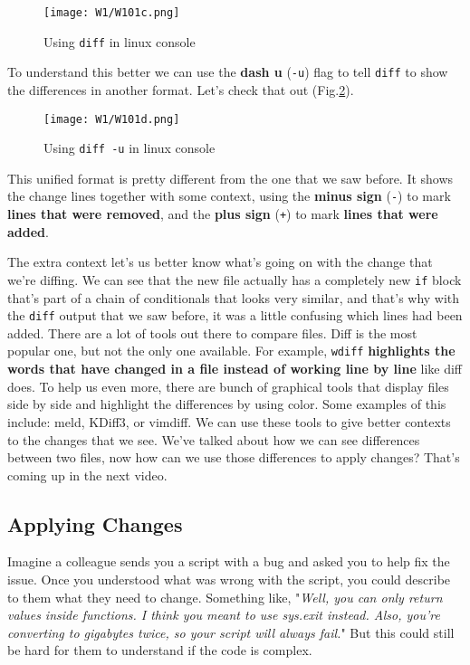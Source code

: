 	\begin{figure} 
		\caption{Using \texttt{diff} in linux console}
		\centering
		\texttt{[image: W1/W101c.png]}
		\label{W101c-diff}
	\end{figure}
	
	
	To understand this better we can use the \textbf{dash u} (\texttt{-u}) flag to tell \texttt{diff} to show the differences in another format. Let's check that out (Fig.\ref{W101d-diff-u}).
	
	\begin{figure} 
		\caption{Using \texttt{diff -u} in linux console}
		\centering
		\texttt{[image: W1/W101d.png]}
		\label{W101d-diff-u}
	\end{figure}

	This unified format is pretty different from the one that we saw before. It shows the change lines together with some context, using the \textbf{minus sign} (\texttt{-}) to mark \textbf{lines that were removed}, and the \textbf{plus sign} (\texttt{+}) to mark \textbf{lines that were added}. 
	
	The extra context let's us better know what's going on with the change that we're diffing. We can see that the new file actually has a completely new \texttt{if} block that's part of a chain of conditionals that looks very similar, and that's why with the \texttt{diff} output that we saw before, it was a little confusing which lines had been added. There are a lot of tools out there to compare files. Diff is the most popular one, but not the only one available. For example, \texttt{wdiff} \textbf{highlights the words that have changed in a file instead of working line by line} like diff does. To help us even more, there are bunch of graphical tools that display files side by side and highlight the differences by using color. Some examples of this include: meld, KDiff3, or vimdiff. We can use these tools to give better contexts to the changes that we see. We've talked about how we can see differences between two files, now how can we use those differences to apply changes? That's coming up in the next video.
	
	\subsection{Applying Changes}
	
	Imagine a colleague sends you a script with a bug and asked you to help fix the issue. Once you understood what was wrong with the script, you could describe to them what they need to change. 
	Something like, "\textit{Well, you can only return values inside functions. I think you meant to use sys.exit instead. Also, you're converting to gigabytes twice, so your script will always fail.}" But this could still be hard for them to understand if the code is complex. 
	
